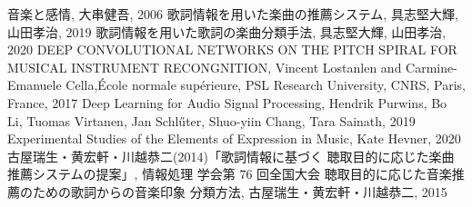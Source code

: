 \documentclass[twocolumn,twoside,9.5pt]{jarticle}
\begin{document}
\begin{thebibliography}{9}

 音楽と感情, 大串健吾, 2006
 歌詞情報を用いた楽曲の推薦システム, 具志堅大輝, 山田孝治, 2019
 歌詞情報を用いた歌詞の楽曲分類手法, 具志堅大輝, 山田孝治, 2020
 DEEP CONVOLUTIONAL NETWORKS ON THE PITCH SPIRAL FOR MUSICAL INSTRUMENT RECONGNITION, Vincent Lostanlen and Carmine-Emanuele Cella,\'{E}cole normale sup\'{e}rieure, PSL Research University, CNRS, Paris, France, 2017
 Deep Learning for Audio Signal Processing, Hendrik Purwins, Bo Li, Tuomas Virtanen, Jan Schl\H{u}ter, Shuo-yiin Chang, Tara Sainath, 2019
 Experimental Studies of the Elements of Expression in Music, Kate Hevner, 2020
 古屋瑞生・黄宏軒・川越恭二(2014)「歌詞情報に基づく 聴取目的に応じた楽曲推薦システムの提案」, 情報処理 学会第 76 回全国大会
 聴取目的に応じた音楽推薦のための歌詞からの音楽印象 分類方法, 古屋瑞生・黄宏軒・川越恭二, 2015


\end{thebibliography}
\end{document}
